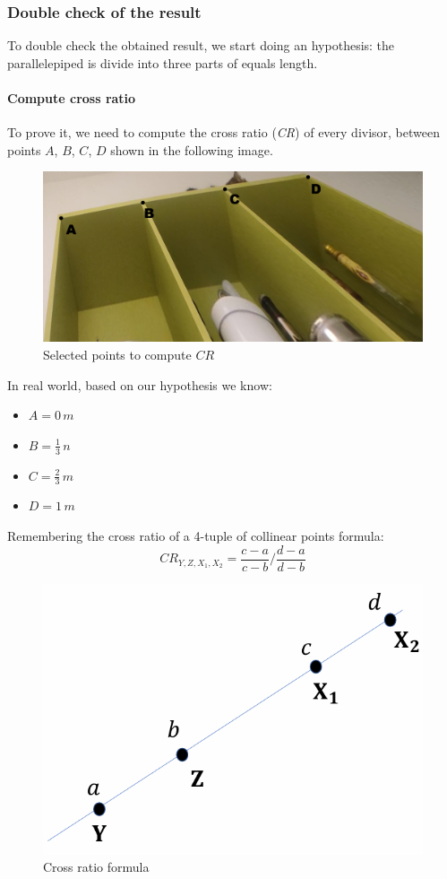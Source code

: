 \subsubsection{Double check of the result}
To double check the obtained result, we start doing an hypothesis: the parallelepiped is divide into three parts of equals length.
\paragraph{Compute cross ratio}
To prove it, we need to compute the cross ratio (\textit{CR}) of every divisor, between points $A$, $B$, $C$, $D$ shown in the following image.

\begin{figure}[H]
    \centering
    \includegraphics[width=0.7\linewidth]{img/cr.png}
    \caption{Selected points to compute $CR$}
    \label{fig:selectedPoints}
\end{figure}

In real world, based on our hypothesis we know:
\begin{itemize}
    \item $A = 0 \, m$
    \item $B = \frac{1}{3} \, n$
    \item $C = \frac{2}{3}\, m$
    \item $D = 1 \, m$
\end{itemize}

Remembering the cross ratio of a 4-tuple of collinear points formula:
$$ CR_{Y,Z,X_1,X_2} = \frac{c-a}{c-b} / \frac{d-a}{d-b}$$
\begin{figure}[H]
    \centering
    \includegraphics[width=0.5\linewidth]{img/crTheory.png}
    \caption{Cross ratio formula}
    \label{fig:crTheory}
\end{figure}


